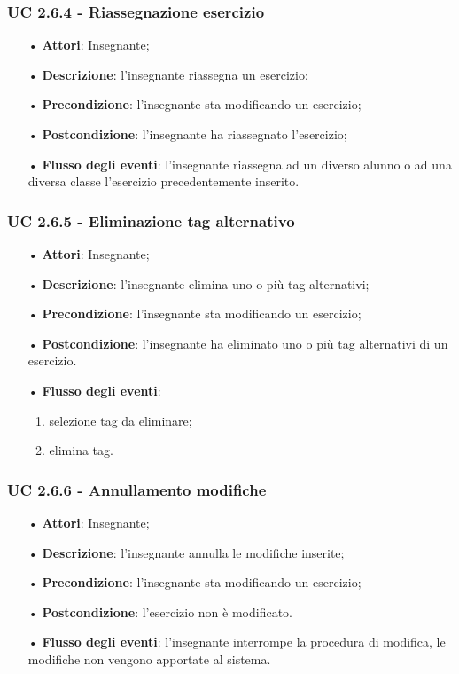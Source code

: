 \subsubsection{UC 2.6.4 - Riassegnazione esercizio}
\begin{itemize}
	\item[•] \textbf{Attori}: Insegnante;
	\item[•] \textbf{Descrizione}: l'insegnante riassegna un esercizio;
	\item[•] \textbf{Precondizione}:  l'insegnante sta modificando un esercizio;
	\item[•] \textbf{Postcondizione}: l'insegnante ha riassegnato l'esercizio;
	\item[•] \textbf{Flusso degli eventi}: l'insegnante riassegna ad un diverso alunno o ad una diversa classe l'esercizio precedentemente inserito.
\end{itemize}


\subsubsection{UC 2.6.5 - Eliminazione tag alternativo}
\begin{itemize}
	\item[•] \textbf{Attori}: Insegnante;
	\item[•] \textbf{Descrizione}: l'insegnante elimina uno o più tag alternativi;
	\item[•] \textbf{Precondizione}: l'insegnante sta modificando un esercizio;
	\item[•] \textbf{Postcondizione}: l'insegnante ha eliminato uno o più tag alternativi di un esercizio.
	\item[•] \textbf{Flusso degli eventi}:
\begin{enumerate}
		\item selezione tag da eliminare;
		\item elimina tag.
\end{enumerate}
\end{itemize}

\subsubsection{UC 2.6.6 - Annullamento modifiche}
\begin{itemize}
	\item[•] \textbf{Attori}: Insegnante;
	\item[•] \textbf{Descrizione}: l'insegnante annulla le modifiche inserite; 
	\item[•] \textbf{Precondizione}: l'insegnante sta modificando un esercizio;
	\item[•] \textbf{Postcondizione}: l'esercizio non è modificato.
	\item[•] \textbf{Flusso degli eventi}: l'insegnante interrompe la procedura di modifica, le modifiche non vengono apportate al sistema.
\end{itemize}


